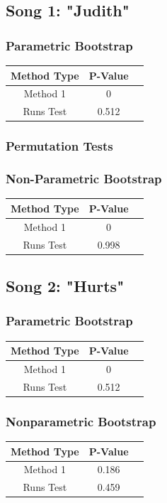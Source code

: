\documentclass[12pt, letterpaper]{article}
\begin{document}
\subsection{Song 1: "Judith"}
\subsubsection{Parametric Bootstrap}
\begin{tabular}{|c|c|c|}
\hline
\textbf{Method Type} & P-Value \\
\hline
Method 1 & 0 \\
\hline
Runs Test & 0.512 \\ 
\hline
\end{tabular}

\subsubsection{Permutation Tests}

\subsubsection{Non-Parametric Bootstrap}
\begin{tabular}{|c|c|c|}
\hline
\textbf{Method Type} & P-Value \\
\hline
Method 1 & 0 \\
\hline
Runs Test & 0.998 \\ 
\hline
\end{tabular}

\subsection{Song 2: "Hurts"}
\subsubsection{Parametric Bootstrap}
\begin{tabular}{|c|c|c|}
\hline
\textbf{Method Type} & P-Value \\
\hline
Method 1 & 0  \\
\hline
Runs Test & 0.512 \\ 
\hline
\end{tabular}

\subsubsection{Nonparametric Bootstrap}
\begin{tabular}{|c|c|c|}
\hline
\textbf{Method Type} & P-Value \\
\hline
Method 1 & 0.186  \\
\hline
Runs Test & 0.459 \\ 
\hline
\end{tabular}
\end{document}
